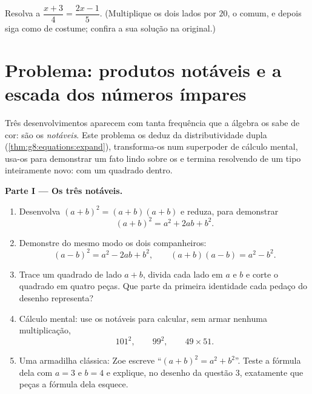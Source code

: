 \begin{exercise}[$\star\star\star$]\label{exo:g8:equations:12}
Resolva a  $\dfrac{x + 3}{4} = \dfrac{2x - 1}{5}$. (Multiplique
os dois lados por $20$, o  comum, e depois siga como de
costume; confira a sua solução na  original.)
\end{exercise}

\section{Problema: produtos notáveis e a escada dos números
ímpares}

\begin{problem}[{Problema de fim de semana --- $(a+b)^2$, $(a-b)^2$,
$(a+b)(a-b)$, e a soma $1 + 3 + 5 + \dots + (2n-1) = n^2$}]
\label{pb:g8:equations:1}
Três desenvolvimentos aparecem com tanta frequência que a álgebra os
sabe de cor: são os \emph{ notáveis}. Este problema os deduz da
distributividade dupla (\cref{thm:g8:equations:expand}), transforma-os
num superpoder de cálculo mental, usa-os para demonstrar um fato lindo
sobre os  e termina resolvendo  de um tipo
inteiramente novo:  com um quadrado dentro.

\medskip
\noindent\textbf{Parte I --- Os três  notáveis.}
\begin{enumerate}
  \item Desenvolva $(a + b)^2 = (a + b)(a + b)$ e reduza, para
        demonstrar
        \[
        (a + b)^2 = a^2 + 2ab + b^2 .
        \]
  \item Demonstre do mesmo modo os dois companheiros:
        \[
        (a - b)^2 = a^2 - 2ab + b^2,
        \qquad
        (a + b)(a - b) = a^2 - b^2 .
        \]
  \item Trace um quadrado de lado $a + b$, divida cada lado em $a$ e
        $b$ e corte o quadrado em quatro peças. Que parte da primeira
        identidade cada pedaço do desenho representa?
  \item Cálculo mental: use os  notáveis para calcular, sem
        armar nenhuma multiplicação,
        \[
        101^2, \qquad 99^2, \qquad 49 \times 51 .
        \]
  \item Uma armadilha clássica: Zoe escreve
        ``$(a + b)^2 = a^2 + b^2$''. Teste a fórmula dela com $a = 3$ e
        $b = 4$ e explique, no desenho da questão 3, exatamente que
        peças a fórmula dela esquece.
\end{enumerate}


\end{problem}
